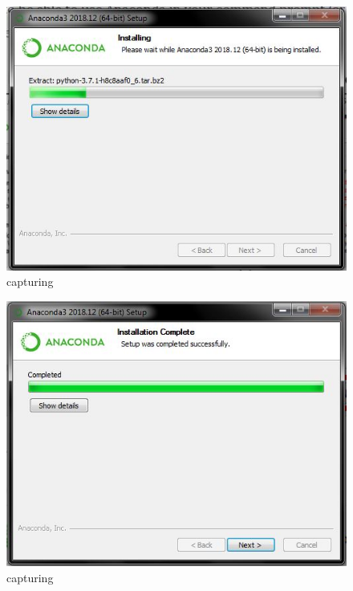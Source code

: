 \begin{enumerate}
\begin{itemize}
\begin{enumerate}
\begin{figure}[ht]
\centering
\includegraphics[scale=0.5]{figures/6.jpg}
\caption{capturing}
\label{proses instalasi}
\end{figure}

\begin{figure}[ht]
\centering
\includegraphics[scale=0.5]{figures/7.jpg}
\caption{capturing}
\label{proses instalasi}
\end{figure}


\end{enumerate}
\end{itemize}
\end{enumerate}

